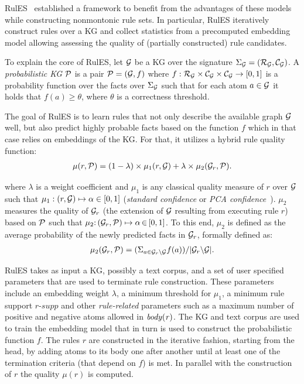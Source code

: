 RulES~\cite{thinh2018} established a framework to benefit from the advantages of these models while constructing nonmontonic rule sets. In particular, RulES iteratively construct rules over a KG and collect statistics from a precomputed embedding model allowing assessing the quality of (partially constructed) rule candidates. 

To explain the core of RulES, let $\mathcal{G}$ be a KG over the signature $\Sigma_{\mathcal{G}}=(\mathcal{R}_{\mathcal{G}},\mathcal{C}_{\mathcal{G}})$. 
A \emph{probabilistic KG} $\mathcal{P}$ is a pair $\mathcal{P} = (\mathcal{G},f)$ 
where $f:\mathcal{R}_{\mathcal{G}}\times \mathcal{C}_{\mathcal{G}} \times \mathcal{C}_{\mathcal{G}}\rightarrow [0,1]$ is a probability function over the facts over $\Sigma_{\mathcal{G}}$ such that for each atom $a \in \mathcal{G} $ it holds that $f(a) \geq \theta $, where $\theta$ is a correctness threshold.

The goal of RulES is to learn rules that not only describe the available graph $\mathcal{G}$ well, but also predict highly probable facts based on the function $f$ which in that case relies on embeddings of the KG. For that, it utilizes a hybrid rule quality function:
\begin{align*}
	\mu(r,\mathcal{P})= (1 - \lambda)\times \mu_1(r,\mathcal{G}) + \lambda \times \mu_2(\mathcal{G}_r,\mathcal{P}).
\end{align*}

where $\lambda$ is a weight coefficient and $\mu_1$ is any classical quality measure of $r$ over $\mathcal{G}$ such that $\mu_1: (r,\mathcal{G}) \mapsto \alpha \in  [0,1]$ (\eg \textit{standard confidence} or \textit{PCA confidence}~\cite{amie}). 
$\mu_2$ measures the quality of $\mathcal{G}_r$ (\ie the extension of $\mathcal{G}$ resulting from executing rule $r$) based on $\mathcal{P}$ such that
 $\mu_2{:}\, (\mathcal{G}_r,\mathcal{P}) \mapsto  \alpha \,{\in}\, [0,1]$. To this end, $\mu_2$ is defined as the average probability of the newly predicted facts in $\mathcal{G}_r$, formally defined as:
\begin{align*}
	\mu_2(\mathcal{G}_r,\mathcal{P}) = (\Sigma_{a\in \mathcal{G}_r\backslash \mathcal{G}} f(a)) /
				|\mathcal{G}_r \backslash \mathcal{G}|.
\end{align*}



RulES takes as input a KG, possibly a text corpus, and a set of user specified parameters that are used to terminate rule construction.
These parameters include an embedding weight $\lambda$, 
a minimum threshold 
for $\mu_1$,  
a minimum rule support $\textit{r-supp}$ 
and other \emph{rule-related} parameters such as a maximum number of positive %
and negative 
atoms allowed in $\mathit{body(r)}$.
The KG and text corpus are used to train the embedding model that in turn is used to construct the probabilistic function $f$.{}
The rules $r$ are constructed in the iterative fashion, starting from the head, by adding atoms to its body one after another until at least one of the termination criteria (that depend on $f$) is met.
In parallel with the construction of $r$ the quality $\mu(r)$ is computed.

